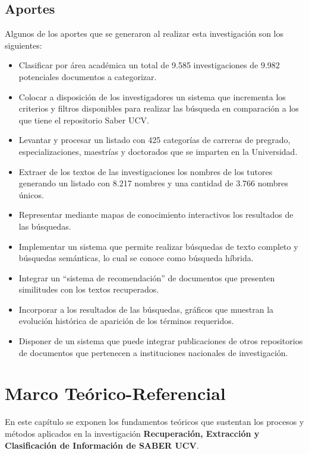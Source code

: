 \documentclass[
  12pt,
  openany]{book}
\begin{document}
\hypertarget{aporte}{%
\section{Aportes}\label{aporte}}

Algunos de los aportes que se generaron al realizar esta investigación son los siguientes:

\begin{itemize}
\item
  Clasificar por área académica un total de 9.585 investigaciones de 9.982 potenciales documentos a categorizar.
\item
  Colocar a disposición de los investigadores un sistema que incrementa los criterios y filtros disponibles para realizar las búsqueda en comparación a los que tiene el repositorio Saber UCV.
\item
  Levantar y procesar un listado con 425 categorías de carreras de pregrado, especializaciones, maestrías y doctorados que se imparten en la Universidad.
\item
  Extraer de los textos de las investigaciones los nombres de los tutores generando un listado con 8.217 nombres y una cantidad de 3.766 nombres únicos.
\item
  Representar mediante mapas de conocimiento interactivos los resultados de las búsquedas.
\item
  Implementar un sistema que permite realizar búsquedas de texto completo y búsquedas semánticas, lo cual se conoce como búsqueda híbrida.
\item
  Integrar un ``sistema de recomendación'' de documentos que presenten similitudes con los textos recuperados.
\item
  Incorporar a los resultados de las búsquedas, gráficos que muestran la evolución histórica de aparición de los términos requeridos.
\item
  Disponer de un sistema que puede integrar publicaciones de otros repositorios de documentos que pertenecen a instituciones nacionales de investigación.
\end{itemize}

\hypertarget{teorico}{%
\chapter{Marco Teórico-Referencial}\label{teorico}}

En este capítulo se exponen los fundamentos teóricos que sustentan los procesos y métodos aplicados en la investigación \textbf{Recuperación, Extracción y Clasificación de Información de SABER UCV}.
\end{document}
